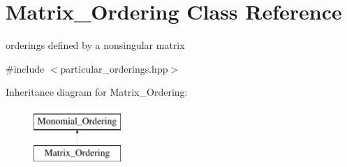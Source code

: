 \hypertarget{class_matrix___ordering}{}\section{Matrix\+\_\+\+Ordering Class Reference}
\label{class_matrix___ordering}


orderings defined by a nonsingular matrix  




{\ttfamily \#include $<$particular\+\_\+orderings.\+hpp$>$}

Inheritance diagram for Matrix\+\_\+\+Ordering\+:\begin{figure}[H]
\begin{center}
\leavevmode
\includegraphics[height=2.000000cm]{class_matrix___ordering}
\end{center}
\end{figure}
